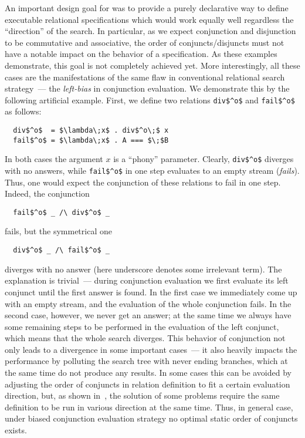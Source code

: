 An important design goal for \mk was to provide a purely declarative way to define executable relational specifications which would work equally well regardless the ``direction'' of the search.
In particular, as we expect conjunction and disjunction to be commutative and associative, the order of conjuncts/disjuncts must not have a notable impact on the behavior of
a specification. As these examples demonstrate, this goal is not completely achieved yet. More interestingly, all these cases are the manifestations of the same flaw in conventional
relational search strategy~--- the \emph{left-bias} in conjunction evaluation. We demonstrate this by the following artificial example. First, we define two relations \lstinline|div$^o$| and
\lstinline|fail$^o$| as follows:

\begin{lstlisting}
  div$^o$  = $\lambda\;x$ . div$^o\;$ x
  fail$^o$ = $\lambda\;x$ . A === $\;$B
\end{lstlisting}

In both cases the argument $x$ is a ``phony'' parameter. Clearly, \lstinline|div$^o$| diverges with no answers, while \lstinline|fail$^o$| in one step evaluates to an empty stream (\emph{fails}). Thus,
one would expect the conjunction of these relations to fail in one step. Indeed, the conjunction

\begin{lstlisting}
  fail$^o$ _ /\ div$^o$ _
\end{lstlisting}

fails, but the symmetrical one

\begin{lstlisting}
  div$^o$ _ /\ fail$^o$ _ 
\end{lstlisting}

diverges with no answer (here underscore denotes some irrelevant term). The explanation is trivial~--- during conjunction evaluation we first evaluate its left conjunct
until the first answer is found. In the first case we immediately come up with an empty stream, and the evaluation of the whole conjunction fails. In the second case,
however, we never get an answer; at the same time we always have some remaining steps to be performed in the evaluation of the left conjunct, which means that the
whole search diverges. This behavior of conjunction not only leads to a divergence in some important cases~--- it also heavily impacts the performance by polluting
the search tree with never ending branches, which at the same time do not produce any results. In some cases this can be avoided by adjusting the order of conjuncts in
relation definition to fit a certain evaluation direction, but, as shown in~\cite{fair:semantics}, the solution of some problems require the same definition to be run in
various direction at the same time. Thus, in general case, under biased conjunction evaluation strategy no optimal static order of conjuncts exists.


